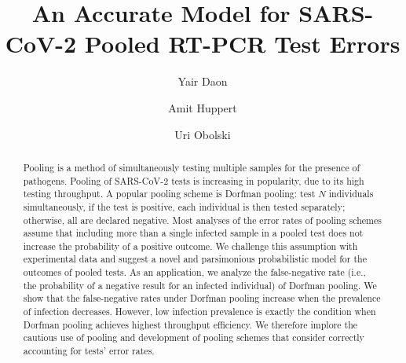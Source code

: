 \documentclass{article}
\begin{document}
\title{An Accurate Model for SARS-CoV-2 Pooled RT-PCR Test Errors}

\author[1,2]{Yair Daon}
\author[1,3,*]{Amit Huppert}
\author[1,2,*]{Uri Obolski}





\date{}

\maketitle

\begin{abstract}
Pooling is a method of simultaneously testing multiple samples for the
presence of pathogens. Pooling of SARS-CoV-2 tests is increasing in
popularity, due to its high testing throughput. A popular pooling
scheme is Dorfman pooling: test $N$ individuals simultaneously, if the
test is positive, each individual is then tested separately;
otherwise, all are declared negative. Most analyses of the error rates
of pooling schemes assume that including more than a single infected
sample in a pooled test does not increase the probability of a
positive outcome. We challenge this assumption with experimental data
and suggest a novel and parsimonious probabilistic model for the
outcomes of pooled tests. As an application, we analyze the
false-negative rate (i.e., the probability of a negative result for an
infected individual) of Dorfman pooling. We show that the
false-negative rates under Dorfman pooling increase when the
prevalence of infection decreases. However, low infection prevalence
is exactly the condition when Dorfman pooling achieves highest
throughput efficiency. We therefore implore the cautious use of
pooling and development of pooling schemes that consider correctly
accounting for tests' error rates.
\end{abstract}
\newpage
\end{document}
